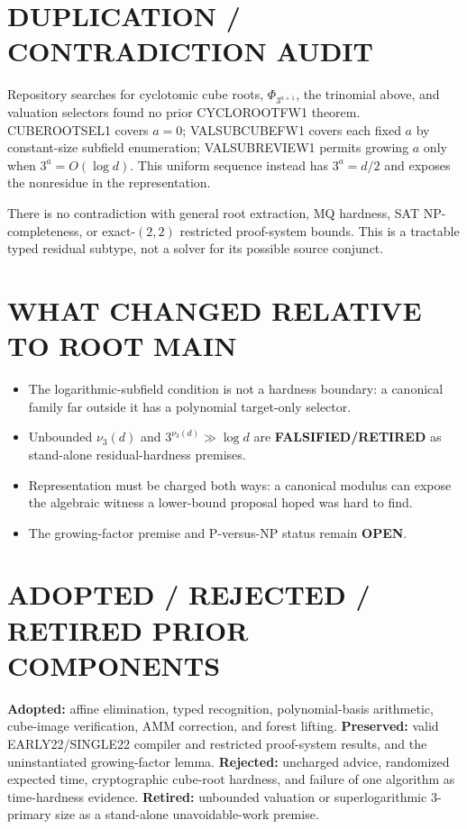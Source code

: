 \documentclass[11pt]{article}
\newcommand{\OPEN}{\textbf{OPEN}}
\newcommand{\RET}{\textbf{FALSIFIED/RETIRED}}
\begin{document}
\section{DUPLICATION / CONTRADICTION AUDIT}
Repository searches for cyclotomic cube roots, $\Phi_{3^{a+1}}$, the
trinomial above, and valuation selectors found no prior CYCLOROOTFW1 theorem.
CUBEROOTSEL1 covers $a=0$; VALSUBCUBEFW1 covers each fixed $a$ by
constant-size subfield enumeration; VALSUBREVIEW1 permits growing $a$ only
when $3^a=O(\log d)$.  This uniform sequence instead has $3^a=d/2$ and
exposes the nonresidue in the representation.

There is no contradiction with general root extraction, MQ hardness, SAT
NP-completeness, or exact-$(2,2)$ restricted proof-system bounds.  This is a
tractable typed residual subtype, not a solver for its possible source
conjunct.

\section{WHAT CHANGED RELATIVE TO ROOT MAIN}
\begin{itemize}
\item The logarithmic-subfield condition is not a hardness boundary: a
canonical family far outside it has a polynomial target-only selector.
\item Unbounded $\nu_3(d)$ and $3^{\nu_3(d)}\gg\log d$ are \RET{} as
stand-alone residual-hardness premises.
\item Representation must be charged both ways: a canonical modulus can
expose the algebraic witness a lower-bound proposal hoped was hard to find.
\item The growing-factor premise and P-versus-NP status remain \OPEN{}.
\end{itemize}

\section{ADOPTED / REJECTED / RETIRED PRIOR COMPONENTS}
\textbf{Adopted:} affine elimination, typed recognition,
polynomial-basis arithmetic, cube-image verification, AMM correction, and
forest lifting.  \textbf{Preserved:} valid EARLY22/SINGLE22 compiler and
restricted proof-system results, and the uninstantiated growing-factor lemma.
\textbf{Rejected:} uncharged advice, randomized expected time, cryptographic
cube-root hardness, and failure of one algorithm as time-hardness evidence.
\textbf{Retired:} unbounded valuation or superlogarithmic $3$-primary size as
a stand-alone unavoidable-work premise.
\end{document}
